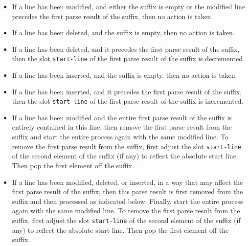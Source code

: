 \begin{itemize}
\item If a line has been modified, and either the suffix is empty or
  the modified line precedes the first parse result of the suffix,
  then no action is taken.
\item If a line has been deleted, and the suffix is empty, then no
  action is taken.
\item If a line has been deleted, and it precedes the first parse
  result of the suffix, then the slot \texttt{start-line} of the first
  parse result of the suffix is decremented.
\item If a line has been inserted, and the suffix is empty, then no
  action is taken.
\item If a line has been inserted, and it precedes the first parse
  result of the suffix, then the slot \texttt{start-line} of the first
  parse result of the suffix is incremented.
\item If a line has been modified and the entire first parse result of
  the suffix is entirely contained in this line, then remove the first
  parse result from the suffix and start the entire process again with
  the same modified line.  To remove the first parse result from the
  suffix, first adjust the slot \texttt{start-line} of the second
  element of the suffix (if any) to reflect the absolute start line.
  Then pop the first element off the suffix.
\item If a line has been modified, deleted, or inserted, in a way that
  may affect the first parse result of the suffix, then this parse
  result is first removed from the suffix and then processed as
  indicated below.  Finally, start the entire process again with the
  same modified line.  To remove the first parse result from the
  suffix, first adjust the slot \texttt{start-line} of the second
  element of the suffix (if any) to reflect the absolute start line.
  Then pop the first element off the suffix.
\end{itemize}
